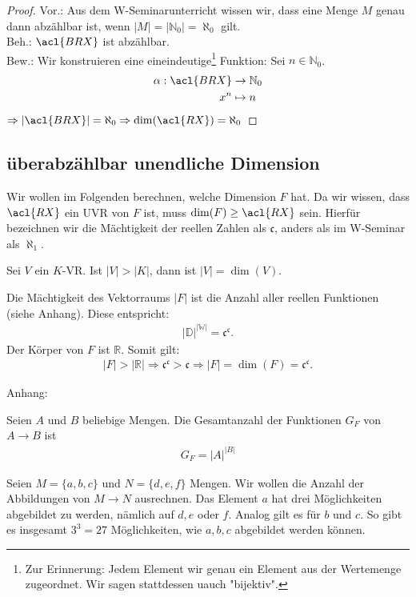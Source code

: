 \begin{proof}
Vor.: Aus dem W-Seminarunterricht wissen wir, dass eine Menge $M$ genau dann abzählbar ist, wenn $|M|=|\mathbb{N}_0|=\aleph_0$ gilt.
\\Beh.: $\acl{BRX}$ ist abzählbar.
\\Bew.: Wir konstruieren eine eineindeutige\footnote{Zur Erinnerung: Jedem Element wir genau ein Element aus der Wertemenge zugeordnet. Wir sagen stattdessen uauch "bijektiv".} Funktion: Sei $n \in \mathbb{N}_0$.
\begin{align}
\alpha: \acl{BRX} &\rightarrow \mathbb{N}_0
\\ x^n &\mapsto n \end{align}
$\Rightarrow |\acl{BRX}|=\aleph_0 \Rightarrow \dim(\acl{RX})=\aleph_0$ 
\end{proof}

\subsection*{überabzählbar unendliche Dimension}
Wir wollen im Folgenden berechnen, welche Dimension $F$ hat. Da wir wissen, dass $\acl{RX}$ ein \acl{UVR} von $F$ ist, muss $\dim(F)\geq\acl{RX}$ sein. Hierfür bezeichnen wir die Mächtigkeit der reellen Zahlen als $\mathfrak {c}$, anders als im W-Seminar als $\aleph_1$.

\begin{Satz}
Sei $V$ ein $K$-\acl{VR}. Ist $|V|>|K|$, dann ist $|V|=\dim(V)$.
\end{Satz}
Die Mächtigkeit des Vektorraums $|F|$ ist die Anzahl aller reellen Funktionen (siehe Anhang). Diese entspricht:
\begin{align*}
|\mathbb{D}|^{|\mathbb{W}|}= \mathfrak {c}^{\mathfrak {c}} \text{.}  
\end{align*} 
Der Körper von $F$ ist $\mathbb{R}$. Somit gilt: 
\begin{align*}|F|>|\mathbb{R}| \Rightarrow  \mathfrak {c}^{\mathfrak {c}} > \mathfrak {c} \Rightarrow |F|=\dim(F)=\mathfrak {c}^{\mathfrak {c}}\text{.} \end{align*}

Anhang: 
\begin{Satz} Seien $A$ und $B$ beliebige Mengen. Die Gesamtanzahl der Funktionen $G_F$ von $A \rightarrow B$ ist 
\begin{align*}
G_F= |A|^{|B|}
\end{align*}
\end{Satz} 
Seien $M=\{a,b,c\}$ und {$N=\{d,e,f\}$} Mengen. Wir wollen die Anzahl der Abbildungen von $M \rightarrow N$ ausrechnen. Das Element $a$ hat drei Möglichkeiten abgebildet zu werden, nämlich auf $d,e$ oder $f$. Analog gilt es für $b$ und $c$. So gibt es insgesamt $3^3=27$ Möglichkeiten, wie $a,b,c$ abgebildet werden können. 












